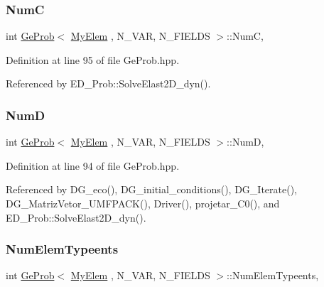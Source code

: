 \subsubsection{\texorpdfstring{NumC}{NumC}}
{\footnotesize\ttfamily int \hyperlink{classGeProb}{Ge\+Prob}$<$ \hyperlink{DG__Prob_8h_a83cd887ced9a6587428f267e50cd4787}{My\+Elem} , N\+\_\+\+V\+AR, N\+\_\+\+F\+I\+E\+L\+DS $>$\+::NumC\hspace{0.3cm}{\ttfamily [protected]}, {\ttfamily [inherited]}}



Definition at line 95 of file Ge\+Prob.\+hpp.



Referenced by E\+D\+\_\+\+Prob\+::\+Solve\+Elast2\+D\+\_\+dyn().

\mbox{\label{classGeProb_a1b63e3bc1b1f5e6582a87b044bbd4ccd}} 
\subsubsection{\texorpdfstring{NumD}{NumD}}
{\footnotesize\ttfamily int \hyperlink{classGeProb}{Ge\+Prob}$<$ \hyperlink{DG__Prob_8h_a83cd887ced9a6587428f267e50cd4787}{My\+Elem} , N\+\_\+\+V\+AR, N\+\_\+\+F\+I\+E\+L\+DS $>$\+::NumD\hspace{0.3cm}{\ttfamily [protected]}, {\ttfamily [inherited]}}



Definition at line 94 of file Ge\+Prob.\+hpp.



Referenced by D\+G\+\_\+eco(), D\+G\+\_\+initial\+\_\+conditions(), D\+G\+\_\+\+Iterate(), D\+G\+\_\+\+Matriz\+Vetor\+\_\+\+U\+M\+F\+P\+A\+C\+K(), Driver(), projetar\+\_\+\+C0(), and E\+D\+\_\+\+Prob\+::\+Solve\+Elast2\+D\+\_\+dyn().

\mbox{\label{classGeProb_a1555edf9114f6b65ef9a7820dfc16e63}} 
\subsubsection{\texorpdfstring{Num\+Elem\+Typeents}{NumElemTypeents}}
{\footnotesize\ttfamily int \hyperlink{classGeProb}{Ge\+Prob}$<$ \hyperlink{DG__Prob_8h_a83cd887ced9a6587428f267e50cd4787}{My\+Elem} , N\+\_\+\+V\+AR, N\+\_\+\+F\+I\+E\+L\+DS $>$\+::Num\+Elem\+Typeents\hspace{0.3cm}{\ttfamily [protected]}, {\ttfamily [inherited]}}



